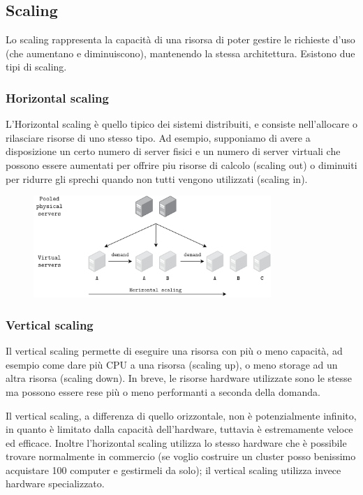\subsection{Scaling}
Lo scaling rappresenta la capacità di una risorsa di poter gestire le richieste d'uso (che aumentano e diminuiscono), mantenendo la stessa architettura. Esistono due tipi di scaling.
\subsubsection{Horizontal scaling}
L'Horizontal scaling è quello tipico dei sistemi distribuiti, e consiste nell'allocare o rilasciare risorse di uno stesso tipo. Ad esempio, supponiamo di avere a disposizione un certo numero di server fisici e un numero di server virtuali che possono essere aumentati per offrire piu risorse di calcolo (scaling out) o diminuiti per ridurre gli sprechi quando non tutti vengono utilizzati (scaling in).
\begin{figure}[ht]
    \centering
    \includegraphics[width=9cm]{./Images/cap2/2.4.png}
    \label{fig:image2.4}
\end{figure}

\subsubsection{Vertical scaling}
Il vertical scaling permette di eseguire una risorsa con più o meno capacità, ad esempio come dare più CPU a una risorsa (scaling up), o meno storage ad un altra risorsa (scaling down). In breve, le risorse hardware utilizzate sono le stesse ma possono essere rese più o meno performanti a seconda della domanda. 
\vspace{5mm}

Il vertical scaling, a differenza di quello orizzontale, non è potenzialmente infinito, in quanto è limitato dalla capacità dell'hardware, tuttavia è estremamente veloce ed efficace. Inoltre l'horizontal scaling utilizza lo stesso hardware che è possibile trovare normalmente in commercio (se voglio costruire un cluster posso benissimo acquistare 100 computer e gestirmeli da solo); il vertical scaling utilizza invece hardware specializzato.
